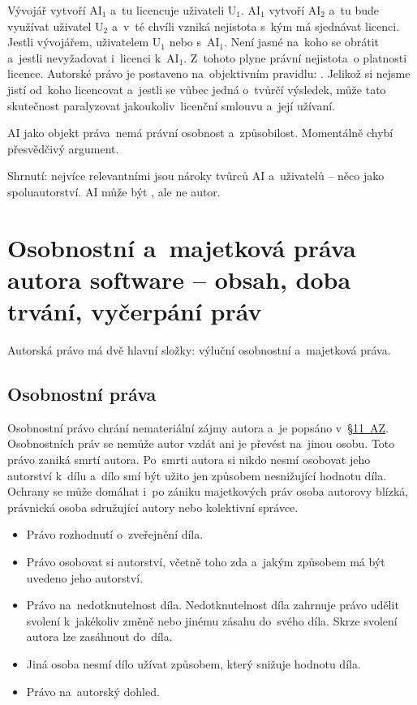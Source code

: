 Vývojář vytvoří AI$_1$ a~tu licencuje uživateli U$_1$. AI$_1$ vytvoří AI$_2$ a~tu bude využívat uživatel U$_2$ a~v~té chvíli vzniká nejistota s~kým má sjednávat licenci. Jestli vývojářem, uživatelem U$_1$ nebo s~AI$_1$. Není jasné na~koho se obrátit a~jestli nevyžadovat i~licenci k~AI$_1$. Z~tohoto plyne právní nejistota~o platnosti licence. Autorské právo je postaveno na~objektivním pravidlu: . Jelikož si nejsme jistí od~koho licencovat a~jestli se vůbec jedná o~tvůrčí výsledek, může tato skutečnost paralyzovat jakoukoliv~licenční smlouvu a~její užívaní.

AI jako objekt práva~nemá právní osobnost a~způsobilost. Momentálně chybí přesvědčivý argument.

Shrnutí: nejvíce relevantními jsou nároky tvůrců AI a~uživatelů -- něco jako spoluautorství. AI může být , ale ne autor.

\clearpage
\section{Osobnostní a~majetková práva autora software -- obsah, doba trvání, vyčerpání práv}

Autorská právo má dvě hlavní složky: výluční osobnostní a~majetková práva.

\subsection{Osobnostní práva}

Osobnostní právo chrání nemateriální zájmy autora a~je popsáno v~\href{https://www.zakonyprolidi.cz/cs/2000-121#p11}{§11~AZ}. Osobnostních práv se nemůže autor vzdát ani je převést na~jinou osobu. Toto právo zaniká smrtí autora. Po~smrti autora si nikdo nesmí osobovat jeho autorství k~dílu a~dílo smí být užito jen způsobem nesnižující hodnotu díla. Ochrany se může domáhat i~po zániku majetkových práv osoba autorovy blízká, právnická osoba sdružující autory nebo kolektivní správce.

\begin{itemize}
	\item Právo rozhodnutí o~zveřejnění díla.
	\item Právo osobovat si autorství, včetně toho zda a~jakým způsobem má být uvedeno jeho autorství.
	\item Právo na~nedotknutelnost díla. Nedotknutelnost díla zahrnuje právo udělit svolení k~jakékoliv změně nebo jinému zásahu do~svého díla. Skrze svolení autora lze zasáhnout do~díla.
	\item Jiná osoba nesmí dílo užívat způsobem, který snižuje hodnotu díla.
	\item Právo na~autorský dohled.
\end{itemize}

